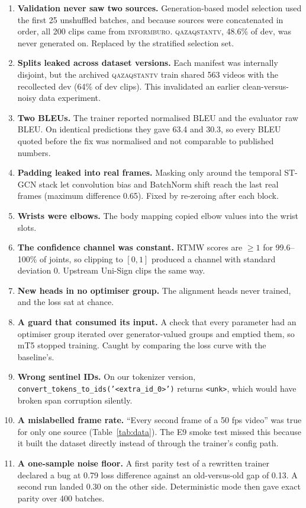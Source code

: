 \documentclass[11pt,twocolumn,a4paper]{article}
\newcommand{\src}[1]{\textsc{#1}}
\newcommand{\ib}{\src{informburo}}
\newcommand{\qz}{\src{qazaqstantv}}
\begin{document}
\begin{enumerate}[leftmargin=*,itemsep=2pt]
\item \textbf{Validation never saw two sources.} Generation-based model selection used the first 25 unshuffled batches, and because sources were concatenated in order, all 200 clips came from \ib. \qz{}, 48.6\% of dev, was never generated on. Replaced by the stratified selection set.
\item \textbf{Splits leaked across dataset versions.} Each manifest was internally disjoint, but the archived \qz{} train shared 563 videos with the recollected dev (64\% of dev clips). This invalidated an earlier clean-versus-noisy data experiment.
\item \textbf{Two BLEUs.} The trainer reported normalised BLEU and the evaluator raw BLEU. On identical predictions they gave 63.4 and 30.3, so every BLEU quoted before the fix was normalised and not comparable to published numbers.
\item \textbf{Padding leaked into real frames.} Masking only around the temporal ST-GCN stack let convolution bias and BatchNorm shift reach the last real frames (maximum difference 0.65). Fixed by re-zeroing after each block.
\item \textbf{Wrists were elbows.} The body mapping copied elbow values into the wrist slots.
\item \textbf{The confidence channel was constant.} RTMW scores are $\geq 1$ for 99.6--100\% of joints, so clipping to $[0, 1]$ produced a channel with standard deviation 0. Upstream Uni-Sign clips the same way.
\item \textbf{New heads in no optimiser group.} The alignment heads never trained, and the loss sat at chance.
\item \textbf{A guard that consumed its input.} A check that every parameter had an optimiser group iterated over generator-valued groups and emptied them, so mT5 stopped training. Caught by comparing the loss curve with the baseline's.
\item \textbf{Wrong sentinel IDs.} On our tokenizer version, \texttt{convert\_tokens\_to\_ids('<extra\_id\_0>')} returns \texttt{<unk>}, which would have broken span corruption silently.
\item \textbf{A mislabelled frame rate.} ``Every second frame of a 50 fps video'' was true for only one source (Table~\ref{tab:data}). The E9 smoke test missed this because it built the dataset directly instead of through the trainer's config path.
\item \textbf{A one-sample noise floor.} A first parity test of a rewritten trainer declared a bug at 0.79 loss difference against an old-versus-old gap of 0.13. A second run landed 0.30 on the other side. Deterministic mode then gave exact parity over 400 batches.
\end{enumerate}
\end{document}
